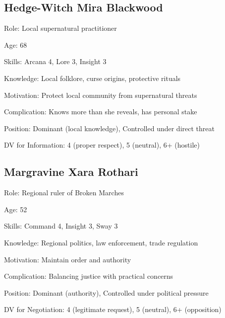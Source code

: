 \documentclass[11pt]{article}
\newenvironment{npc}[1]{\begin{description}[leftmargin=*,style=standard]\item[\textbf{#1}]}{\end{description}}
\begin{document}
\subsection{Hedge-Witch Mira Blackwood}
\begin{npc}{Hedge-Witch Mira Blackwood}
\item[Role:] Local supernatural practitioner
\item[Age:] 68
\item[Skills:] Arcana 4, Lore 3, Insight 3
\item[Knowledge:] Local folklore, curse origins, protective rituals
\item[Motivation:] Protect local community from supernatural threats
\item[Complication:] Knows more than she reveals, has personal stake
\item[Position:] Dominant (local knowledge), Controlled under direct threat
\item[DV for Information:] 4 (proper respect), 5 (neutral), 6+ (hostile)
\end{npc}

\subsection{Margravine Xara Rothari}
\begin{npc}{Margravine Xara Rothari}
\item[Role:] Regional ruler of Broken Marches
\item[Age:] 52
\item[Skills:] Command 4, Insight 3, Sway 3
\item[Knowledge:] Regional politics, law enforcement, trade regulation
\item[Motivation:] Maintain order and authority
\item[Complication:] Balancing justice with practical concerns
\item[Position:] Dominant (authority), Controlled under political pressure
\item[DV for Negotiation:] 4 (legitimate request), 5 (neutral), 6+ (opposition)
\end{npc}
\end{document}
